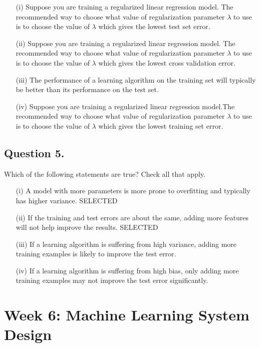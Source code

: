 \documentclass[11pt]{article} %
\begin{document}
\begin{itemize}
	\item[(i)]
Suppose you are training a regularized linear regression model. The recommended way to choose what value of regularization parameter $\lambda$ to use is to choose the value of $\lambda$ which gives the lowest test set error.
	\item[(ii)]
Suppose you are training a regularized linear regression model. The recommended way to choose what value of regularization parameter $\lambda$ to use is to choose the value of $\lambda$ which gives the lowest cross validation error.
	\item[(iii)]
The performance of a learning algorithm on the training set will typically be better than its performance on the test set.
	\item[(iv)]
Suppose you are training a regularized linear regression model.The recommended way to choose what value of regularization parameter $\lambda$ to use is to choose the value of $\lambda$ which gives the lowest training set error.
\end{itemize}

\subsection*{Question 5. }
Which of the following statements are true? Check all that apply.

\begin{itemize}
	\item[(i)]
A model with more parameters is more prone to overfitting and typically has higher variance. SELECTED
	\item[(ii)]
If the training and test errors are about the same, adding more features will not help improve the results. SELECTED
	\item[(iii)]
If a learning algorithm is suffering from high variance, adding more training examples is likely to improve the test error.
	\item[(iv)]
If a learning algorithm is suffering from high bias, only adding more training examples may not improve the test error significantly.
\end{itemize}
\newpage
\section*{Week 6: Machine Learning System Design}
\end{document}
